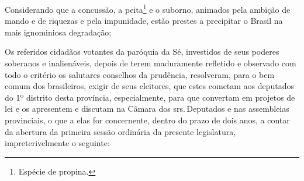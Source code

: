Considerando que a concussão, a peita\footnote{Espécie de propina.} e
o suborno, animados pela ambição de mando e de riquezas e pela
impunidade, estão prestes a precipitar o Brasil na mais ignominiosa
degradação;

Os referidos cidadãos votantes da paróquia da Sé, investidos de seus
poderes soberanos e inalienáveis, depois de terem maduramente refletido
e observado com todo o critério os salutares conselhos da prudência,
resolveram, para o bem comum dos brasileiros, exigir de seus eleitores,
que estes cometam aos deputados do 1º distrito desta província,
especialmente, para que convertam em projetos de lei e os apresentem e
discutam na Câmara dos srs.\,Deputados e nas assembleias provinciais, o
que a elas for concernente, dentro do prazo de dois anos, a contar da
abertura da primeira sessão ordinária da presente legislatura,
impreterivelmente o seguinte:

